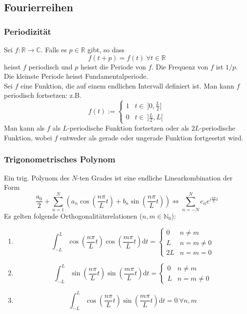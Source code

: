 \documentclass[8pt, a4paper, landscape, fleqn]{scrartcl}
\def\R{\mathbb{R}}
\def\N{\mathbb{N}}
\def\C{\mathbb{C}}
\def\d{\text{d}}
\newcommand{\blue}[1]{\textcolor{ethblue}{#1}}
\begin{document}
\begin{multicols*}{3}
		
		\subsection{Fourierreihen}
		\subsubsection{Periodizität}
		Sei $f: \R \to \C$. Falls es $p\in\R$ gibt, so dass $$f(t+p) = f(t) \ \forall t\in\R$$ heisst $f$ \blue{periodisch} und $p$ heisst die Periode von $f$. Die Frequenz von $f$ ist $1/p$. Die kleinste Periode heisst Fundamentalperiode.\\
		Sei $f$ eine Funktion, die auf einem endlichen Intervall definiert ist. Man kann $f$ periodisch fortsetzen: z.B. $$f(t) := \begin{cases}
		1 & t\in \ ]0, \frac{L}{2}]\\ 0 & t\in \ ]\frac{L}{2}, L[ \end{cases} $$ Man kann als $f$ als $L$-periodische Funktion fortsetzen oder als $2L$-periodische Funktion, wobei $f$ entweder als gerade oder ungerade Funktion fortgesetzt wird.
		
		\subsubsection{Trigonometrisches Polynom}
		Ein trig. Polynom des $N$-ten Grades ist eine endliche Linearkombination der Form $$ \frac{a_0}{2}+\sum_{n=1}^N\left(a_n \cos\left(\frac{n\pi}{L}t\right)+b_n \sin\left(\frac{n\pi}{L}t\right)\right) \Leftrightarrow \sum_{n = -N}^N c_n e^{i\frac{n\pi}{L}t}$$
		Es gelten folgende Orthogonalitätsrelationen ($n, m \in \N_0$):
		\begin{enumerate}
		    \item $$ \int_{-L}^L \cos\left(\frac{n\pi}{L}t\right)\cos\left(\frac{m\pi}{L}t\right)\d t = \begin{cases}
		    0 & n\neq m \\ L & n = m \neq 0 \\ 2L & n = m = 0 \end{cases} $$
		    \item $$ \int_{-L}^L \sin\left(\frac{n\pi}{L}t\right)\sin\left(\frac{m\pi}{L}t\right)\d t = \begin{cases}
		    0 & n\neq m \\ L & n = m \neq 0 \end{cases} $$
		    \item $$ \int_{-L}^L \cos\left(\frac{n\pi}{L}t\right)\sin\left(\frac{m\pi}{L}t\right)\d t = 0 \ \forall n, m$$
		\end{enumerate}
		

\end{multicols*}
\end{document}
